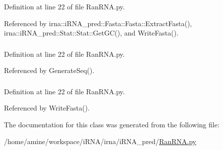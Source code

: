 \-Definition at line 22 of file \-Ran\-R\-N\-A.\-py.



\-Referenced by irna\-::i\-R\-N\-A\-\_\-pred\-::\-Fasta\-::\-Fasta\-::\-Extract\-Fasta(), irna\-::i\-R\-N\-A\-\_\-pred\-::\-Stat\-::\-Stat\-::\-Get\-G\-C(), and \-Write\-Fasta().

\hypertarget{classirna_1_1iRNA__pred_1_1RanRNA_1_1RanRNA_a069b3f16570948070f1db059847c47ee}{
\subsubsection[{\-Out\-Rep}]{}}
\label{classirna_1_1iRNA__pred_1_1RanRNA_1_1RanRNA_a069b3f16570948070f1db059847c47ee}


\-Definition at line 22 of file \-Ran\-R\-N\-A.\-py.



\-Referenced by \-Generate\-Seq().

\hypertarget{classirna_1_1iRNA__pred_1_1RanRNA_1_1RanRNA_a064614728179d3c749c1275a28c66046}{
\subsubsection[{\-Seq\-Length}]{}}
\label{classirna_1_1iRNA__pred_1_1RanRNA_1_1RanRNA_a064614728179d3c749c1275a28c66046}


\-Definition at line 22 of file \-Ran\-R\-N\-A.\-py.



\-Referenced by \-Write\-Fasta().



\-The documentation for this class was generated from the following file\-:\begin{DoxyCompactItemize}
\item 
/home/amine/workspace/i\-R\-N\-A/irna/i\-R\-N\-A\-\_\-pred/\hyperlink{RanRNA_8py}{\-Ran\-R\-N\-A.\-py}\end{DoxyCompactItemize}
